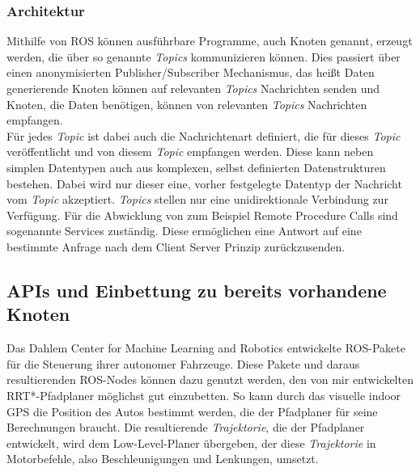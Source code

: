 \subsubsection{Architektur}
Mithilfe von ROS können ausführbare Programme, auch Knoten genannt, erzeugt werden, die über so genannte \textit{Topics} kommunizieren können. Dies passiert über einen anonymisierten Publisher/Subscriber Mechanismus, das heißt Daten generierende Knoten können auf relevanten \textit{Topics} Nachrichten senden und Knoten, die Daten benötigen, können von relevanten \textit{Topics} Nachrichten empfangen. \\
Für jedes \textit{Topic} ist dabei auch die Nachrichtenart definiert, die für dieses \textit{Topic} veröffentlicht und von diesem \textit{Topic} empfangen werden. Diese kann neben simplen Datentypen auch aus komplexen, selbst definierten Datenstrukturen bestehen. Dabei wird nur dieser eine, vorher festgelegte Datentyp der Nachricht vom \textit{Topic} akzeptiert.
\textit{Topics} stellen nur eine unidirektionale Verbindung zur Verfügung. Für die Abwicklung von zum Beispiel Remote Procedure Calls sind sogenannte Services zuständig. Diese ermöglichen eine Antwort auf eine bestimmte Anfrage nach dem Client Server Prinzip zurückzusenden.
\subsection{APIs und Einbettung zu bereits vorhandene Knoten}
Das Dahlem Center for Machine Learning and Robotics entwickelte ROS-Pakete für die Steuerung ihrer autonomer Fahrzeuge. Diese Pakete und daraus resultierenden ROS-Nodes können dazu genutzt werden, den von mir entwickelten RRT*-Pfadplaner möglichst gut einzubetten. So kann durch das visuelle indoor GPS die Position des Autos bestimmt werden, die der Pfadplaner für seine Berechnungen braucht. Die resultierende \textit{Trajektorie}, die der Pfadplaner entwickelt, wird dem Low-Level-Planer übergeben, der diese \textit{Trajektorie} in Motorbefehle, also Beschleunigungen und Lenkungen, umsetzt. 
